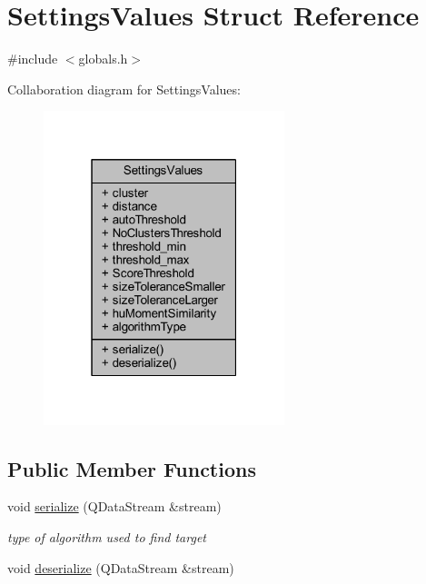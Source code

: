\hypertarget{struct_settings_values}{}\section{Settings\+Values Struct Reference}
\label{struct_settings_values}


{\ttfamily \#include $<$globals.\+h$>$}



Collaboration diagram for Settings\+Values\+:
\nopagebreak
\begin{figure}[H]
\begin{center}
\leavevmode
\includegraphics[width=199pt]{struct_settings_values__coll__graph}
\end{center}
\end{figure}
\subsection*{Public Member Functions}
\begin{DoxyCompactItemize}
\item 
void \hyperlink{struct_settings_values_ad4544b482570ff509c6afef78071a003}{serialize} (Q\+Data\+Stream \&stream)
\begin{DoxyCompactList}\small\item\em type of algorithm used to find target \end{DoxyCompactList}\item 
void \hyperlink{struct_settings_values_aa8366afce6108e4404af7d6f98ad1368}{deserialize} (Q\+Data\+Stream \&stream)
\end{DoxyCompactItemize}
